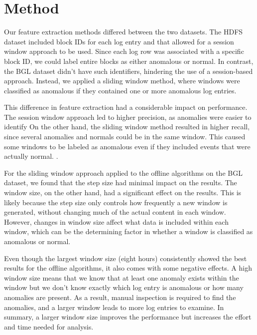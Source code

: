 \section{Method}
\label{sec:discussion-method}
Our feature extraction methods differed between the two datasets. The HDFS dataset included block IDs for each log entry and that allowed for a session window approach to be used. Since each log row was associated with a specific block ID, we could label entire blocks as either anomalous or normal. In contrast, the BGL dataset didn't have such identifiers, hindering the use of a session-based approach. Instead, we applied a sliding window method, where windows were classified as anomalous if they contained one or more anomalous log entries.

This difference in feature extraction had a considerable impact on performance. The session window approach led to higher precision, as anomalies were easier to identify On the other hand, the sliding window method resulted in higher recall, since several anomalies and normals could be in the same window. This caused some windows to be labeled as anomalous even if they included events that were actually normal. . 

For the sliding window approach applied to the offline algorithms on the BGL dataset, we found that the step size had minimal impact on the results. The window size, on the other hand, had a significant effect on the results. This is likely because the step size only controls how frequently a new window is generated, without changing much of the actual content in each window. However, changes in window size affect what data is included within each window, which can be the determining factor in whether a window is classified as anomalous or normal.

Even though the largest window size (eight hours) consistently showed the best results for the offline algorithms, it also comes with some negative effects. A high window size means that we know that at least one anomaly exists within the window but we don't know exactly which log entry is anomalous or how many anomalies are present. As a result, manual inspection is required to find the anomalies, and a larger window leads to more log entries to examine. In summary, a larger window size improves the performance but increases the effort and time needed for analysis.

